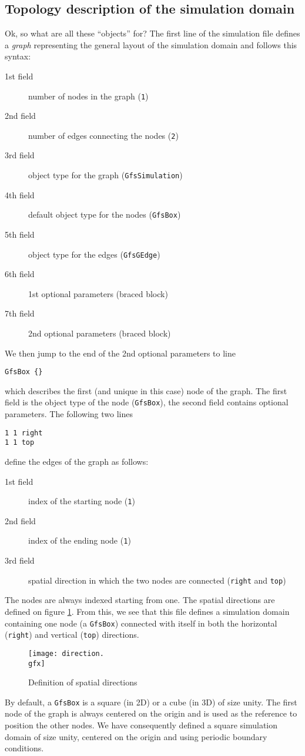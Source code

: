\documentclass[a4paper]{article}
\begin{document}
\subsection{Topology description of the simulation domain}

Ok, so what are all these ``objects'' for?  The first line of the
simulation file defines a {\em graph} representing the general layout
of the simulation domain and follows this syntax:
\begin{description}
\item[1st field] number of nodes in the graph ({\tt 1})
\item[2nd field] number of edges connecting the nodes ({\tt 2})
\item[3rd field] object type for the graph ({\tt GfsSimulation})
\item[4th field] default object type for the nodes ({\tt GfsBox})
\item[5th field] object type for the edges ({\tt GfsGEdge})
\item[6th field] 1st optional parameters (braced block)
\item[7th field] 2nd optional parameters (braced block)
\end{description}
We then jump to the end of the 2nd optional parameters to line
\begin{verbatim}
GfsBox {}
\end{verbatim}
which describes the first (and unique in this case) node of the
graph. The first field is the object type of the node ({\tt GfsBox}),
the second field contains optional parameters.
The following two lines 
\begin{verbatim}
1 1 right
1 1 top
\end{verbatim}
define the edges of the graph as follows:
\begin{description}
\item[1st field] index of the starting node ({\tt 1})
\item[2nd field] index of the ending node   ({\tt 1})
\item[3rd field] spatial direction in which the two nodes are
connected ({\tt right} and {\tt top})
\end{description}
The nodes are always indexed starting from one. The spatial directions 
are defined on figure \ref{direction}.
From this, we see that this file defines a simulation domain
containing one node (a {\tt GfsBox}) connected with itself in both the
horizontal ({\tt right}) and vertical ({\tt top}) directions.
\begin{figure}[htbp]
\begin{center}
\texttt{[image: direction.\\gfx]}
\end{center}
\caption{Definition of spatial directions}
\label{direction}
\end{figure}
By default, a {\tt GfsBox} is a square (in 2D) or a cube (in 3D) of
size unity. The first node of the graph is always centered on the
origin and is used as the reference to position the other nodes.  We
have consequently defined a square simulation domain of size unity,
centered on the origin and using periodic boundary conditions.
\end{document}
